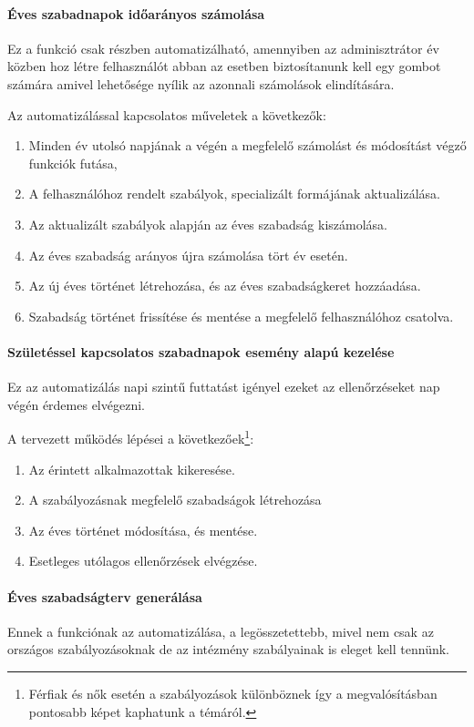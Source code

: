 \paragraph{Éves szabadnapok időarányos számolása}
Ez a funkció csak részben automatizálható, amennyiben az adminisztrátor év közben hoz létre felhasználót abban az esetben biztosítanunk kell egy gombot számára amivel lehetősége nyílik az azonnali számolások elindítására.

Az automatizálással kapcsolatos műveletek a következők:
\begin{enumerate}
	\item Minden év utolsó napjának a végén a megfelelő számolást és módosítást végző funkciók futása,
	\item A felhasználóhoz rendelt szabályok, specializált formájának aktualizálása.
	\item Az aktualizált szabályok alapján az éves szabadság kiszámolása.
	\item Az éves szabadság arányos újra számolása tört év esetén.
	\item Az új éves történet létrehozása, és az éves szabadságkeret hozzáadása.
	\item Szabadság történet frissítése és mentése a megfelelő felhasználóhoz csatolva.
\end{enumerate}

\paragraph{Születéssel kapcsolatos szabadnapok esemény alapú kezelése}
Ez az automatizálás napi szintű futtatást igényel ezeket az ellenőrzéseket nap végén érdemes elvégezni.

A tervezett működés lépései a következőek\footnote{Férfiak és nők esetén a szabályozások különböznek így a megvalósításban pontosabb képet kaphatunk a témáról.}:
\begin{enumerate}
	\item Az érintett alkalmazottak kikeresése.
	\item A szabályozásnak megfelelő szabadságok létrehozása
	\item Az éves történet módosítása, és mentése.
	\item Esetleges utólagos ellenőrzések elvégzése.
\end{enumerate}

\paragraph{Éves szabadságterv generálása}
Ennek a funkciónak az automatizálása, a legösszetettebb, mivel nem csak az országos szabályozásoknak de az intézmény szabályainak is eleget kell tennünk.

